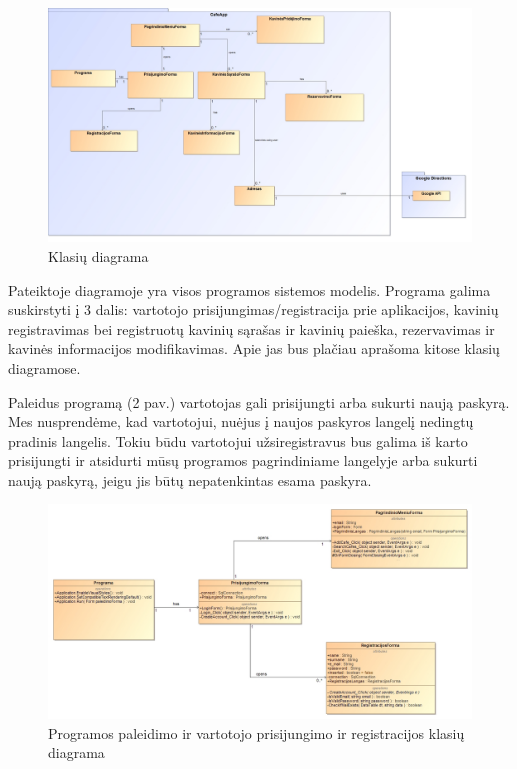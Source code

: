 \documentclass{VUMIFPSkursinis}
\begin{document}
\begin{figure}[H]
    \centering
    \includegraphics[width=\textwidth,height=\textheight,keepaspectratio]{img/Model} 
    \caption{Klasių diagrama}
    \label{img:Model}
\end{figure}
Pateiktoje diagramoje yra visos programos sistemos modelis. Programa galima suskirstyti į 3 dalis: vartotojo prisijungimas/registracija prie aplikacijos, kavinių registravimas bei registruotų kavinių sąrašas ir kavinių paieška, rezervavimas ir kavinės informacijos modifikavimas. Apie jas bus plačiau aprašoma kitose klasių diagramose.
\pagebreak

Paleidus programą (2 pav.) vartotojas gali prisijungti arba sukurti naują paskyrą. Mes nusprendėme, kad vartotojui, nuėjus į naujos paskyros langelį nedingtų pradinis langelis. Tokiu būdu vartotojui užsiregistravus bus galima iš karto prisijungti ir atsidurti mūsų programos pagrindiniame langelyje arba sukurti naują paskyrą, jeigu jis būtų nepatenkintas esama paskyra. 
\newline
\newline
\newline
\newline
\newline
\newline
\begin{figure}[H]
    \centering
    \includegraphics[width=\textwidth,height=\textheight,keepaspectratio]{img/Program_LoginForm_Register_MainMenu} 
    \caption{Programos paleidimo ir vartotojo prisijungimo ir registracijos  klasių diagrama}
    \label{img:Program_LoginForm_Register_MainMenu}
\end{figure}
\end{document}
